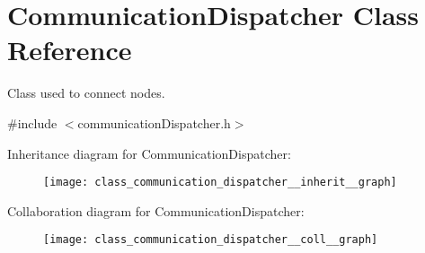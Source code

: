 \hypertarget{class_communication_dispatcher}{}\section{Communication\+Dispatcher Class Reference}
\label{class_communication_dispatcher}


Class used to connect nodes.  




{\ttfamily \#include $<$communication\+Dispatcher.\+h$>$}



Inheritance diagram for Communication\+Dispatcher\+:\nopagebreak
\begin{figure}[H]
\begin{center}
\leavevmode
\texttt{[image: class\_communication\_dispatcher\_\_inherit\_\_graph]}
\end{center}
\end{figure}


Collaboration diagram for Communication\+Dispatcher\+:\nopagebreak
\begin{figure}[H]
\begin{center}
\leavevmode
\texttt{[image: class\_communication\_dispatcher\_\_coll\_\_graph]}
\end{center}
\end{figure}
